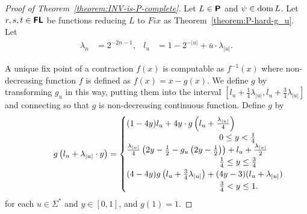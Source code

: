\documentclass[envcountsect,envcountsame,orivec,oribibl]{llncs}
\newcommand{\classtwofont}[1]{\text{\bfseries \sffamily \upshape #1}}
\newcommand{\classFLtwo}{\classtwofont{FL}}
\newcommand{\classPtwo}{\classtwofont{P}}
\newcommand{\OpCMFix}{\mathit{Fix}}
\newcommand{\dom}{\mathop{\rm dom}}
\begin{document}
\begin{proof}
[Proof of Theorem~\ref{theorem:INV-is-P-complete}]
Let $L \in \classPtwo$ and $\psi \in \dom L$.
Let $r, s, t \in \classFLtwo$ be functions reducing $L$ to $\OpCMFix$
as Theorem~\ref{theorem:P-hard-g_u}.
Let
\begin{align}
 \lambda_n &= 2^{-2n-1},
 &
 l_u & = 1 - 2^{-|u|} + \bar u \cdot \lambda_{|u|}.
\end{align}

A unique fix point of a contraction $f(x)$ is computable as
$f^{-1}(x)$ where non-decreasing function $f$ is defined as $f(x) = x - g(x)$.
We define $g$ by transforming $g_u$ in this way, putting them into the
interval $[l_u + \frac{1}{4}\lambda_{|u|}, l_u + \frac{3}{4}\lambda_{|u|}]$
and connecting so that $g$ is non-decreasing continuous function.
Define $g$ by
\begin{equation}
\label{equation: definition of g}
 g \left( l_u + \lambda_{|u|} \cdot y \right) =
 \begin{cases}
  \rlap{$(1-4y)l_u + 4y \cdot g \left( l_u + \frac{\lambda_{|u|}}{4} \right)$}
  \hspace*{10em}
  \\
  &
  0 \le y < \frac 1 4
  \\
  \rlap{$\frac{\lambda_{|u|}}{4} \left( 2y - \frac 1 2 - g_u \left( 2y - \frac 1 2 \right) \right) + l_u + \frac{\lambda_{|u|}}{2}$}
  \\
  &
  \frac 1 4 \le y \le \frac 3 4
  \\
  \rlap{$(4-4y) g \left( l_u + \frac 3 4 \lambda_{|u|} \right) + (4y-3)(l_u + \lambda_{|u|})$}
  \\
  &
  \frac 3 4 < y \le 1.
 \end{cases}\notag
\end{equation}
for each $u \in \varSigma^*$ and $y \in [0,1]$, and $g(1) = 1$.


\end{proof}
\end{document}
